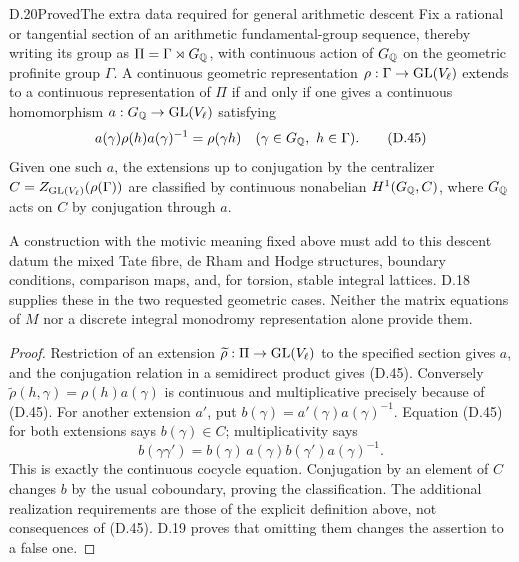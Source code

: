 \begin{statement}{D.20}{Proved}{The extra data required for general arithmetic descent}
Fix a rational or tangential section of an arithmetic
fundamental-group sequence, thereby writing its group as
\(\Pi=\Gamma\rtimes G_\mathbb Q\), with continuous action of
\(G_\mathbb Q\) on the geometric profinite group \(\Gamma\).
A continuous geometric representation
\(\rho:\Gamma\to\operatorname{GL}(V_\ell)\) extends to a continuous
representation of \(\Pi\) if and only if one gives a
continuous homomorphism \(a:G_\mathbb Q\to\operatorname{GL}(V_\ell)\) satisfying
\[
 a(\gamma)\rho(h)a(\gamma)^{-1}=\rho(\gamma h)
       \quad(\gamma\in G_\mathbb Q,\ h\in\Gamma).
 \tag{D.45}
\]
Given one such \(a\), the extensions up to conjugation
by the centralizer \(C=Z_{\operatorname{GL}(V_\ell)}(\rho(\Gamma))\)
are classified by continuous nonabelian
\(H^1(G_\mathbb Q,C)\), where \(G_\mathbb Q\) acts on \(C\) by
conjugation through \(a\).

A construction with the motivic meaning fixed above must
add to this descent datum the mixed Tate fibre,
de Rham and Hodge structures, boundary conditions,
comparison maps, and, for torsion, stable integral
lattices.  D.18 supplies these in the two requested
geometric cases.  Neither the matrix equations of \(M\)
nor a discrete integral monodromy representation alone
provide them.
\end{statement}
\begin{proof}
Restriction of an extension \(\widetilde\rho:\Pi\to\operatorname{GL}(V_\ell)\)
to the specified section gives \(a\), and the conjugation
relation in a semidirect product gives (D.45).
Conversely
\(\widetilde\rho(h,\gamma)=\rho(h)a(\gamma)\)
is continuous and multiplicative precisely because
of (D.45).
For another extension \(a'\), put
\(b(\gamma)=a'(\gamma)a(\gamma)^{-1}\).
Equation (D.45) for both extensions says \(b(\gamma)\in C\);
multiplicativity says
\[
 b(\gamma\gamma')=
 b(\gamma)\,a(\gamma)b(\gamma')a(\gamma)^{-1}.
 \tag{D.46}
\]
This is exactly the continuous cocycle equation.
Conjugation by an element of \(C\) changes \(b\) by the
usual coboundary, proving the classification.
The additional realization requirements are those of
the explicit definition above, not consequences of
(D.45).  D.19 proves that omitting them changes the
assertion to a false one.
\end{proof}
